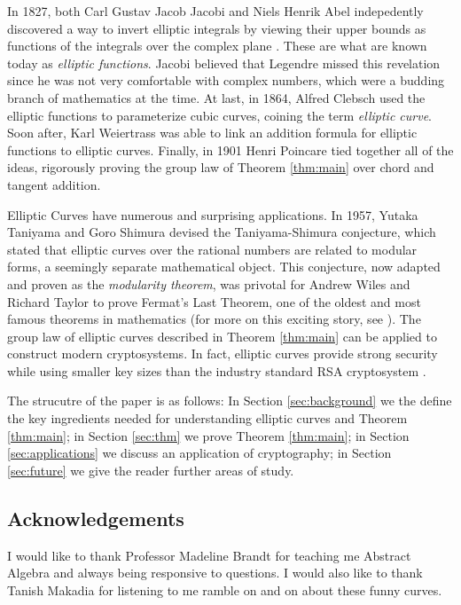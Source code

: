 \documentclass[]{math_paper}
\begin{document}
In 1827, both Carl Gustav Jacob Jacobi and Niels Henrik Abel indepedently discovered a way to invert elliptic integrals by viewing their upper bounds as functions of the integrals over the complex plane\cite{jacobi1829fundamenta} \cite{abel}. These are what are known today as \emph{elliptic functions}. Jacobi believed that Legendre missed this revelation since he was not very comfortable with complex numbers, which were a budding branch of mathematics at the time. At last, in 1864, Alfred Clebsch used the elliptic functions to parameterize cubic curves, coining the term \emph{elliptic curve}. Soon after, Karl Weiertrass was able to link an addition formula for elliptic functions to elliptic curves. Finally, in 1901 Henri Poincare tied together all of the ideas, rigorously proving the group law of Theorem \ref{thm:main} over chord and tangent addition\cite{H1901}.

Elliptic Curves have numerous and surprising applications. In 1957, Yutaka Taniyama and Goro Shimura devised the Taniyama-Shimura conjecture, which stated that elliptic curves over the rational numbers are related to modular forms, a seemingly separate mathematical object. This conjecture, now adapted and proven as the \emph{modularity theorem}, was privotal for Andrew Wiles and Richard Taylor to prove Fermat's Last Theorem, one of the oldest and most famous theorems in mathematics (for more on this exciting story, see \cite{singh1998fermat}). The group law of elliptic curves described in Theorem \ref{thm:main} can be applied to construct modern cryptosystems. In fact, elliptic curves provide strong security while using smaller key sizes than the industry standard RSA cryptosystem \cite{stein2008elementary}.

The strucutre of the paper is as follows: In Section \ref{sec:background} we the define the key ingredients needed for understanding elliptic curves and Theorem \ref{thm:main}; in Section \ref{sec:thm} we prove Theorem \ref{thm:main}; in Section \ref{sec:applications} we discuss an application of cryptography; in Section \ref{sec:future} we give the reader further areas of study.

\subsection*{Acknowledgements}
I would like to thank Professor Madeline Brandt for teaching me Abstract Algebra and always being responsive to questions. I would also like to thank Tanish Makadia for listening to me ramble on and on about these funny curves.
\end{document}

